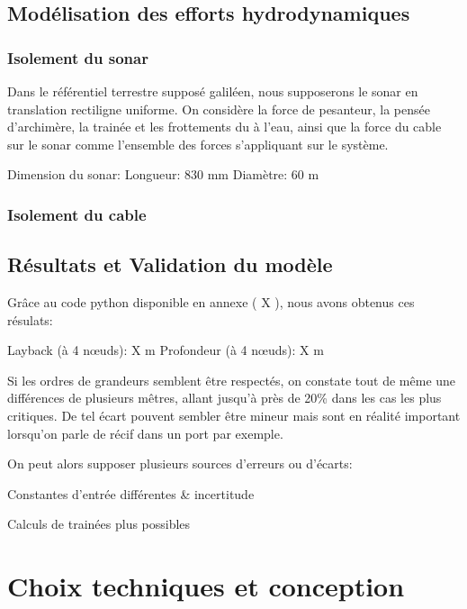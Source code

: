 \documentclass[12pt,a4paper]{article}
\begin{document}
\subsection{Modélisation des efforts hydrodynamiques}


\subsubsection{Isolement du sonar}


Dans le référentiel terrestre supposé galiléen, nous supposerons le sonar en translation rectiligne uniforme.
On considère la force de pesanteur, la pensée d'archimère, la trainée et les frottements du à l'eau,
ainsi que la force du cable sur le sonar comme l'ensemble des forces s'appliquant sur le système.


Dimension du sonar:
    Longueur: 830 mm
    Diamètre: 60 m


\subsubsection{Isolement du cable}

\subsection{Résultats et Validation du modèle}


Grâce au code python disponible en annexe ( X ), nous avons obtenus ces résulats:

Layback (à 4 nœuds): X m
Profondeur (à 4 nœuds): X m

Si les ordres de grandeurs semblent être respectés, on constate tout de même une différences de plusieurs mêtres,
allant jusqu'à près de 20\% dans les cas les plus critiques.
De tel écart pouvent sembler être mineur mais sont en réalité important lorsqu'on parle de récif dans un port par exemple.

On peut alors supposer plusieurs sources d'erreurs ou d'écarts:

\item Constantes d'entrée différentes & incertitude
\item Calculs de trainées plus possibles





\section{Choix techniques et conception}
\end{document}
